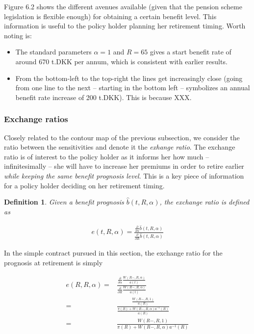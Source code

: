 \documentclass{article}
\newcommand{\1}[1]{\mathbbm{1}_{\left\lbrace #1 \right\rbrace}}
\theoremstyle{break}
\newtheorem{definition}{Definition}[section]
\theoremstyle{remark}
\numberwithin{equation}{section}
\begin{document}
Figure 6.2 shows the different avenues available (given that the pension scheme legislation is flexible enough) for obtaining a certain benefit level. This information is useful to the policy holder planning her retirement timing. Worth noting is:

\begin{itemize}
	\item The standard parameters $\alpha=1$ and $R=65$ gives a start benefit rate of around 670 t.DKK per annum, which is consistent with earlier results.
	\item From the bottom-left to the top-right the lines get increasingly close (going from one line to the next -- starting in the bottom left -- symbolizes an annual benefit rate increase of 200 t.DKK). This is because XXX.
\end{itemize}

\subsubsection{Exchange ratios}

Closely related to the contour map of the previous subsection, we consider the ratio between the sensitivities and denote it the \textit{exhange ratio}. The exchange ratio is of interest to the policy holder as it informs her how much -- infinitesimally -- she will have to increase her premiums in order to retire earlier \textit{while keeping the same benefit prognosis level}. This is a key piece of information for a policy holder deciding on her retirement timing.

\begin{definition}
	Given a benefit prognosis $\hat{b}(t,R,\alpha)$, the exchange ratio is defined as
	
\begin{align*}
	e(t,R,\alpha) = \frac{\frac{\partial}{\partial \alpha }\hat{b}(t,R,\alpha)}{\frac{\partial}{\partial R }\hat{b}(t,R,\alpha)}
\end{align*}
\end{definition}

In the simple contract pursued in this section, the exchange ratio for the prognosis at retirement is simply

\begin{align*}
	e(R,R,\alpha) =& \frac{\frac{\partial}{\partial \alpha }\frac{W(R-,R,\alpha)}{a(t)}}{\frac{\partial}{\partial R }\frac{W(R-,R,\alpha)}{a(t)}} \\
	=& \frac{\frac{W(R-,R,1)}{a(R)}}{\frac{\pi (R) + W(R-,R,\alpha) a^{-1}(R)}{a(R)}} \\
	=& \frac{W(R-,R,1)}{\pi (R) + W(R-,R,\alpha) a^{-1}(R)}
\end{align*}
\end{document}
